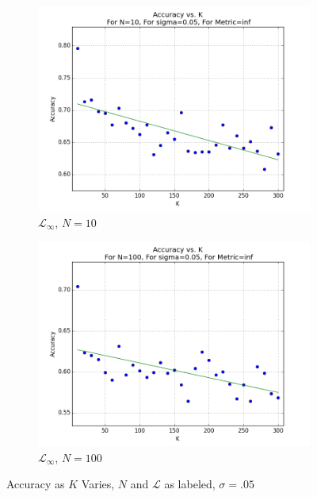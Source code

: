 \documentclass{article}
\begin{document}
\begin{figure}[H]
\centering
   \ContinuedFloat 
    \begin{subfigure}[h]{0.75\textwidth}
        \includegraphics[width=\textwidth]{l-experiment1-2-accuracy-k-n-10-s-005-linf.png}
        \caption{$\mathcal{L}_{\infty}$, $N=10$}
        \label{fig:exp2k1-inf}
    \end{subfigure}
   \begin{subfigure}[h]{0.75\textwidth}
        \includegraphics[width=\textwidth]{l-experiment1-2-accuracy-k-n-100-s-005-linf.png}
        \caption{$\mathcal{L}_{\infty}$, $N=100$}
        \label{fig:exp2k2-inf}
    \end{subfigure}
    \caption{Accuracy as $K$ Varies, $N$ and $\mathcal{L}$ as labeled, $\sigma=.05$}
    \label{fig:exp1-2-accuracy-k}
\end{figure}
\end{document}
